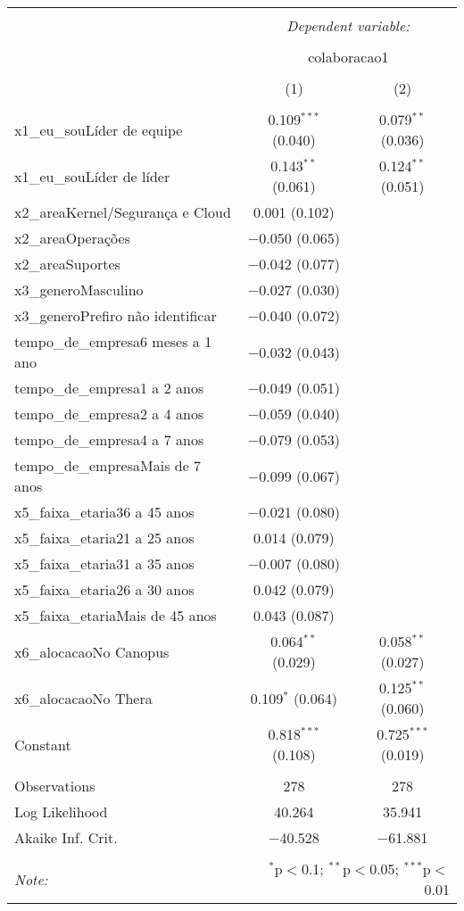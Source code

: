\documentclass[]{book}
\begin{document}
\begin{table}[!htbp] \centering 
  \caption{} 
  \label{} 
\begin{tabular}{@{\extracolsep{5pt}}lcc} 
\\[-1.8ex]\hline 
\hline \\[-1.8ex] 
 & \multicolumn{2}{c}{\textit{Dependent variable:}} \\ 
\cline{2-3} 
\\[-1.8ex] & \multicolumn{2}{c}{colaboracao1} \\ 
\\[-1.8ex] & (1) & (2)\\ 
\hline \\[-1.8ex] 
 x1\_eu\_souLíder de equipe & 0.109$^{***}$ (0.040) & 0.079$^{**}$ (0.036) \\ 
  x1\_eu\_souLíder de líder & 0.143$^{**}$ (0.061) & 0.124$^{**}$ (0.051) \\ 
  x2\_areaKernel/Segurança e Cloud & 0.001 (0.102) &  \\ 
  x2\_areaOperações & $-$0.050 (0.065) &  \\ 
  x2\_areaSuportes & $-$0.042 (0.077) &  \\ 
  x3\_generoMasculino & $-$0.027 (0.030) &  \\ 
  x3\_generoPrefiro não identificar & $-$0.040 (0.072) &  \\ 
  tempo\_de\_empresa6 meses a 1 ano & $-$0.032 (0.043) &  \\ 
  tempo\_de\_empresa1 a 2 anos & $-$0.049 (0.051) &  \\ 
  tempo\_de\_empresa2 a 4 anos & $-$0.059 (0.040) &  \\ 
  tempo\_de\_empresa4 a 7 anos & $-$0.079 (0.053) &  \\ 
  tempo\_de\_empresaMais de 7 anos & $-$0.099 (0.067) &  \\ 
  x5\_faixa\_etaria36 a 45 anos & $-$0.021 (0.080) &  \\ 
  x5\_faixa\_etaria21 a 25 anos & 0.014 (0.079) &  \\ 
  x5\_faixa\_etaria31 a 35 anos & $-$0.007 (0.080) &  \\ 
  x5\_faixa\_etaria26 a 30 anos & 0.042 (0.079) &  \\ 
  x5\_faixa\_etariaMais de 45 anos & 0.043 (0.087) &  \\ 
  x6\_alocacaoNo Canopus & 0.064$^{**}$ (0.029) & 0.058$^{**}$ (0.027) \\ 
  x6\_alocacaoNo Thera & 0.109$^{*}$ (0.064) & 0.125$^{**}$ (0.060) \\ 
  Constant & 0.818$^{***}$ (0.108) & 0.725$^{***}$ (0.019) \\ 
 \hline \\[-1.8ex] 
Observations & 278 & 278 \\ 
Log Likelihood & 40.264 & 35.941 \\ 
Akaike Inf. Crit. & $-$40.528 & $-$61.881 \\ 
\hline 
\hline \\[-1.8ex] 
\textit{Note:}  & \multicolumn{2}{r}{$^{*}$p$<$0.1; $^{**}$p$<$0.05; $^{***}$p$<$0.01} \\ 
\end{tabular} 
\end{table}
\end{document}
